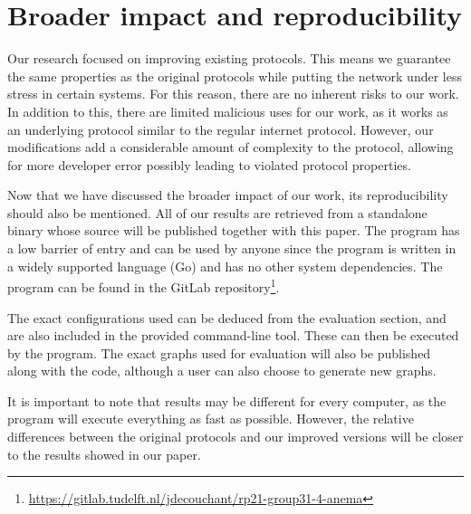 \section{Broader impact and reproducibility}
\label{broader-impact}
Our research focused on improving existing protocols. This means we guarantee the same properties as the original protocols while putting the network under less stress in certain systems. For this reason, there are no inherent risks to our work. In addition to this, there are limited malicious uses for our work, as it works as an underlying protocol similar to the regular internet protocol. 
However, our modifications add a considerable amount of complexity to the protocol, allowing for more developer error possibly leading to violated protocol properties.


Now that we have discussed the broader impact of our work, its reproducibility should also be mentioned. All of our results are retrieved from a standalone binary whose source will be published together with this paper. The program has a low barrier of entry and can be used by anyone since the program is written in a widely supported language (Go) and has no other system dependencies. The program can be found in the GitLab repository\footnote{\url{https://gitlab.tudelft.nl/jdecouchant/rp21-group31-4-anema}}.

The exact configurations used can be deduced from the evaluation section, and are also included in the provided command-line tool. These can then be executed by the program. The exact graphs used for evaluation will also be published along with the code, although a user can also choose to generate new graphs. 

It is important to note that results may be different for every computer, as the program will execute everything as fast as possible. However, the relative differences between the original protocols and our improved versions will be closer to the results showed in our paper.

